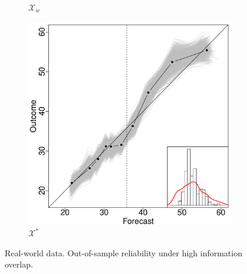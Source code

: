 \documentclass[11pt]{article}
\theoremstyle{definition}
\theoremstyle{definition}
\begin{document}
\begin{figure}
\begin{subfigure}[b]{0.323\textwidth}
                \caption{$\mathcal{X}_w$}
                \label{fig:gull}
        \end{subfigure}%
        \begin{subfigure}[b]{0.323\textwidth}
                \includegraphics[width=\textwidth]{DependentE-OLP}
                \caption{$\mathcal{X}^*$}
                \label{DepEOLPConrete}
        \end{subfigure}
          \caption{Real-world data. Out-of-sample reliability under high information overlap. }
               \label{RelDiagramHigh}
\end{figure}
\end{document}
